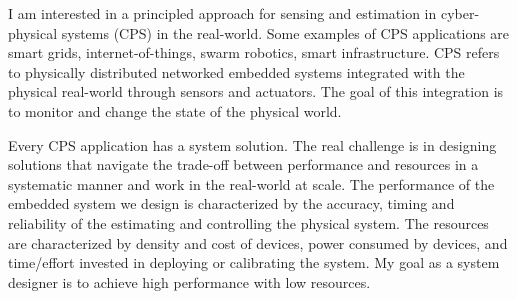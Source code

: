 \documentclass[10pt]{article}
\begin{document}








I am interested in a principled approach for sensing and estimation in cyber-physical systems (CPS) in the real-world. Some examples of CPS applications are smart grids, internet-of-things, swarm robotics, smart infrastructure.
CPS refers to physically distributed networked embedded systems integrated with the physical real-world through sensors and actuators. The goal of this integration is to monitor and change the state of the physical world. 

Every CPS application has a system solution. The real challenge is in designing solutions that navigate the trade-off between performance and resources in a systematic manner and work in the real-world at scale. %
The performance of the embedded system we design is characterized by the accuracy, timing and reliability of the estimating and controlling the physical system. The resources are characterized by density and cost of devices, power consumed by devices, and time/effort invested in deploying or calibrating the system. My goal as a system designer is to achieve high performance with low resources. %
\end{document}
